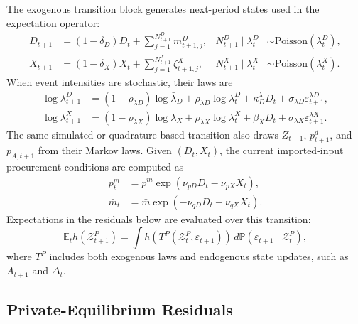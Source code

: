 ﻿\documentclass[12pt]{article}
\theoremstyle{remark}
\newcommand{\E}{\mathbb E}
\newcommand{\dd}{\,d}
\begin{document}
The exogenous transition block generates next-period states used in the expectation operator:
\begin{align}
    D_{t+1}
    &=
    (1-\delta_D)D_t
    +
    \sum_{j=1}^{N_{t+1}^D}m_{t+1,j}^D,
    &
    N_{t+1}^D\mid\lambda_t^D
    &\sim \mathrm{Poisson}(\lambda_t^D),
    \label{eq:app_deqn_D_transition}\\
    X_{t+1}
    &=
    (1-\delta_X)X_t
    +
    \sum_{j=1}^{N_{t+1}^X}\zeta_{t+1,j}^X,
    &
    N_{t+1}^X\mid\lambda_t^X
    &\sim \mathrm{Poisson}(\lambda_t^X).
    \label{eq:app_deqn_X_transition}
\end{align}
When event intensities are stochastic, their laws are
\begin{align}
    \log\lambda_{t+1}^D
    &=
    (1-\rho_{\lambda D})\log\bar\lambda_D
    +
    \rho_{\lambda D}\log\lambda_t^D
    +
    \kappa_D^\lambda D_t
    +
    \sigma_{\lambda D}\varepsilon_{t+1}^{\lambda D},
    \label{eq:app_deqn_lambda_D}\\
    \log\lambda_{t+1}^X
    &=
    (1-\rho_{\lambda X})\log\bar\lambda_X
    +
    \rho_{\lambda X}\log\lambda_t^X
    +
    \beta_XD_t
    +
    \sigma_{\lambda X}\varepsilon_{t+1}^{\lambda X}.
    \label{eq:app_deqn_lambda_X}
\end{align}
The same simulated or quadrature-based transition also draws $Z_{t+1}$, $p_{t+1}^d$, and
$p_{A,t+1}$ from their Markov laws. Given $(D_t,X_t)$, the current imported-input procurement
conditions are computed as
\begin{align}
    p_t^m
    &=
    \bar p^m
    \exp(\nu_{pD}D_t-\nu_{pX}X_t),
    \label{eq:app_deqn_pm}\\
    \bar m_t
    &=
    \bar m
    \exp(-\nu_{qD}D_t+\nu_{qX}X_t).
    \label{eq:app_deqn_mbar}
\end{align}
Expectations in the residuals below are evaluated over this transition:
\begin{equation}
    \E_t h(\mathcal Z_{t+1}^P)
    =
    \int
    h\!\left(T^P(\mathcal Z_t^P,\varepsilon_{t+1})\right)
    \dd \mathbb P(\varepsilon_{t+1}\mid\mathcal Z_t^P),
    \label{eq:app_deqn_expectation_operator}
\end{equation}
where $T^P$ includes both exogenous laws and endogenous state updates, such as
$A_{t+1}$ and $\Delta_t$.

\subsection{Private-Equilibrium Residuals}
\end{document}
